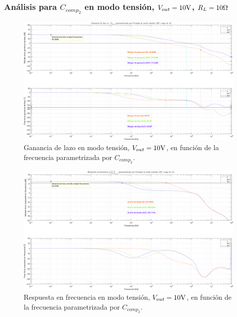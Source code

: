 
\subsubsection{Análisis para $C_{comp_{2}}$ en modo tensión, $V_{out} = 10 \si[per-mode=symbol]{\volt}$, $R_{L} = 10 \si[per-mode=symbol]{\ohm}$}

\clearpage

\begin{figure}[H] %
\begin{center}
\includegraphics[width=1.1 \textwidth, angle=90]{./img/plots/loop/power_supply_CCOMP2_LOOP_Modo1.png}
\caption{\label{fig:fig_power_supply_CCOMP2_LOOP_Modo1}\footnotesize{Ganancia de lazo en modo tensión, $V_{out} = 10 \si[per-mode=symbol]{\volt}$, en función de la frecuencia parametrizada por $C_{comp_{2}}$.}}
\end{center}
\end{figure}


\clearpage

\begin{figure}[H] %
\begin{center}
\includegraphics[width=1.1 \textwidth, angle=90]{./img/plots/rf/power_supply_CCOMP2_RF_Modo1.png}
\caption{\label{fig:fig_power_supply_CCOMP2_RF_Modo1}\footnotesize{Respuesta en frecuencia en modo tensión, $V_{out} = 10 \si[per-mode=symbol]{\volt}$, en función de la frecuencia parametrizada por $C_{comp_{2}}$.}}
\end{center}
\end{figure}

